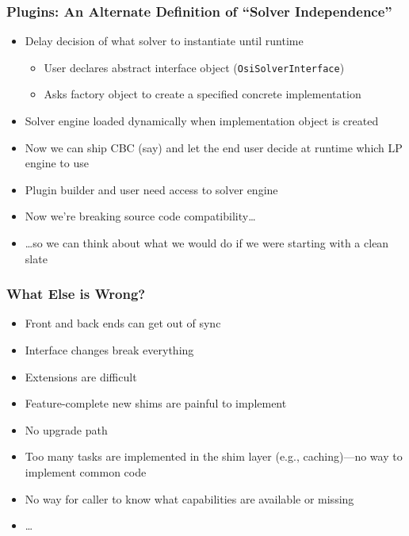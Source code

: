 \documentclass{beamer}
\begin{document}
\begin{frame}
  \frametitle{Plugins: An Alternate Definition of ``Solver Independence''}

  \begin{itemize}
  \item Delay decision of what solver to instantiate until runtime
    \begin{itemize}
    \item User declares abstract interface object (\texttt{OsiSolverInterface})
    \item Asks factory object to create a specified concrete implementation
    \end{itemize}
  \item Solver engine loaded dynamically when implementation object
    is created
  \item Now we can ship CBC (say) and let the end user decide at runtime
    which LP engine to use
  \item Plugin builder and user need access to solver engine
    \pause
  \item Now we're breaking source code compatibility\dots
    \pause
  \item \dots so we can think about what we would do if we were
    starting with a clean slate
  \end{itemize}
\end{frame}

\begin{frame}
  \frametitle{What Else is Wrong?}

  \begin{itemize}
  \item Front and back ends can get out of sync
  \item Interface changes break everything
  \item Extensions are difficult
  \item Feature-complete new shims are painful to implement
  \item No upgrade path
  \item Too many tasks are implemented in the shim layer (e.g.,
    caching)---no way to implement common code
  \item No way for caller to know what capabilities are available or
    missing
  \item \dots
  \end{itemize}
\end{frame}
\end{document}
